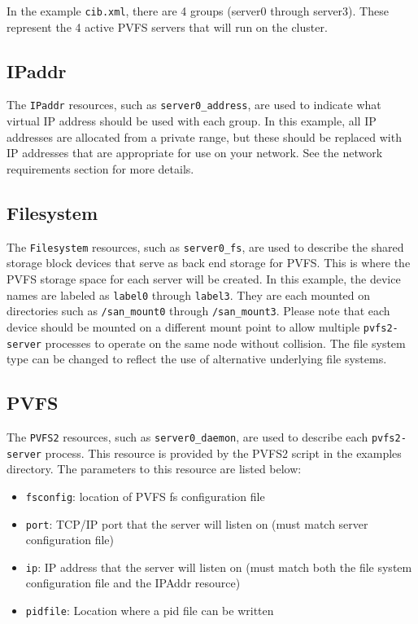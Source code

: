\documentclass[11pt]{article}
\begin{document}
In the example \texttt{cib.xml}, there are 4 groups (server0 through
server3).  These represent the 4 active PVFS servers that will run on
the cluster.

\subsection{IPaddr}

The \texttt{IPaddr} resources, such as \texttt{server0\_address}, are
used to indicate what virtual IP address should be used with each group.
In this example, all IP addresses are allocated from a private range, but
these should be replaced with IP addresses that are appropriate for use
on your network.  See the network requirements section for more details.

\subsection{Filesystem}

The \texttt{Filesystem} resources, such as \texttt{server0\_fs}, are used to
describe the shared storage block devices that serve as back end storage
for PVFS.  This is where the PVFS storage space for each server will
be created.  In this example, the device names are labeled as
\texttt{label0}
through \texttt{label3}.  They are each mounted on directories such
as \texttt{/san\_mount0} through \texttt{/san\_mount3}.  Please note
that each device should be mounted on a different mount point to allow
multiple \texttt{pvfs2-server} processes to operate on the same node without
collision.  The file system type can be changed to reflect the use of
alternative underlying file systems.

\subsection{PVFS}

The \texttt{PVFS2} resources, such as \texttt{server0\_daemon}, are used
to describe each \texttt{pvfs2-server} process.  This resource is provided by the
PVFS2 script in the examples directory.  The parameters to this resource
are listed below:
\begin{itemize}
\item \texttt{fsconfig}: location of PVFS fs configuration file
\item \texttt{port}: TCP/IP port that the server will listen on (must match server
configuration file)
\item \texttt{ip}: IP address that the server will listen on (must match both the file
system configuration file and the IPAddr resource)
\item \texttt{pidfile}: Location where a pid file can be written
\end{itemize}
\end{document}
